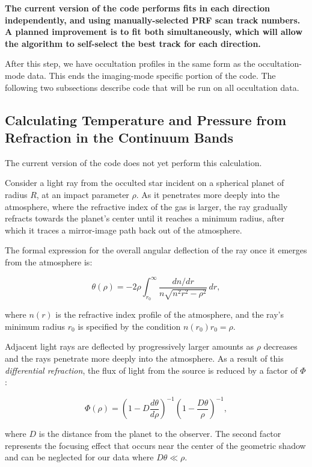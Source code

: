 \documentclass[12pt]{article}
\begin{document}
{\bf The current version of the code performs fits in each direction independently,
and using manually-selected PRF scan track numbers. A planned improvement is to
fit both simultaneously, which will allow the algorithm to self-select the best
track for each direction.} 

After this step, we have occultation profiles in the same form as the
occultation-mode data. This ends the imaging-mode specific portion of the code.
The following two subsections describe code that will be run on all occultation
data.

\subsection{Calculating Temperature and Pressure from Refraction in the Continuum Bands}

The current version of the code does not yet perform this calculation.

Consider a light ray from the occulted star incident on a spherical planet of
radius $R$, at an impact parameter $\rho$. As it penetrates more deeply into
the atmosphere, where the refractive index of the gas is larger, the ray
gradually refracts towards the planet's center until it reaches a minimum
radius, after which it traces a mirror-image path back out of the atmosphere.

The formal expression for the overall angular deflection of the ray once it
emerges from the atmosphere is:

\begin{equation}
 \theta(\rho) = -2\rho \int_{r_0}^\infty \frac{dn/dr}{n\sqrt{n^2r^2 - \rho^2}}\, dr,
\end{equation}

\noindent where $n(r)$  is the refractive index profile of the atmosphere,
and the ray's minimum radius $r_0$ is specified by the condition $n(r_0)r_0 = \rho$.

Adjacent light rays are deflected by progressively larger amounts as $\rho$
decreases and the rays penetrate more deeply into the atmosphere. As a result
of this {\it differential refraction}, the flux of light from the source is
reduced by a factor of $\Phi$:

\begin{equation}
 \Phi(\rho) = \left( 1 - D\frac{d\theta}{d\rho} \right)^{-1}\left( 1 - \frac{D\theta}{\rho} \right)^{-1},
\label{eq:iso_flux}
\end{equation}

\noindent where $D$ is the distance from the planet to the observer. The second
factor represents the focusing effect that occurs near the center of the
geometric shadow and can be neglected for our data where $D\theta\ll\rho$.
\end{document}
